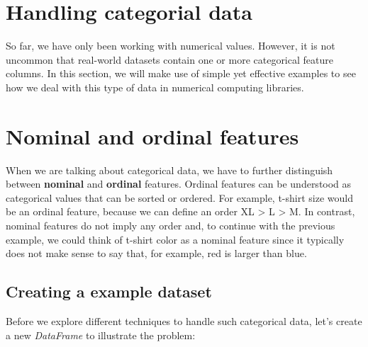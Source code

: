 \documentclass[11pt]{article}
\begin{document}
    \section{Handling categorial data}\label{handling-categorial-data}

    So far, we have only been working with numerical values. However, it is
not uncommon that real-world datasets contain one or more categorical
feature columns. In this section, we will make use of simple yet
effective examples to see how we deal with this type of data in
numerical computing libraries.

    \section{Nominal and ordinal
features}\label{nominal-and-ordinal-features}

    When we are talking about categorical data, we have to further
distinguish between \textbf{nominal} and \textbf{ordinal} features.
Ordinal features can be understood as categorical values that can be
sorted or ordered. For example, t-shirt size would be an ordinal
feature, because we can define an order XL \textgreater{} L
\textgreater{} M. In contrast, nominal features do not imply any order
and, to continue with the previous example, we could think of t-shirt
color as a nominal feature since it typically does not make sense to say
that, for example, red is larger than blue.

    \subsection{Creating a example
dataset}\label{creating-a-example-dataset}

    Before we explore different techniques to handle such categorical data,
let's create a new \emph{DataFrame} to illustrate the problem:
\end{document}
